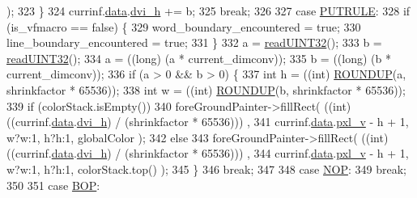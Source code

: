 \begin{DoxyCode}
{       );
323           \}
324           currinf.\hyperlink{structdrawinf_af73f66288002f0a25c7843a534bf1340}{data}.\hyperlink{structframedata_a530699c241126f99b81cee11c2c1c4e4}{dvi\_h} += b;
325           \textcolor{keywordflow}{break};
326 
327         \textcolor{keywordflow}{case} \hyperlink{dvi_8h_a88170eaff2ef781cd64fadda8b19ee87}{PUTRULE}:
328           \textcolor{keywordflow}{if} (is\_vfmacro == \textcolor{keyword}{false}) \{
329             word\_boundary\_encountered = \textcolor{keyword}{true};
330             line\_boundary\_encountered = \textcolor{keyword}{true};
331           \}
332           a = \hyperlink{classbigEndianByteReader_a39c3b90a7617e40cef20796fbc680df8}{readUINT32}();
333           b = \hyperlink{classbigEndianByteReader_a39c3b90a7617e40cef20796fbc680df8}{readUINT32}();
334           a = ((long) (a *  current\_dimconv));
335           b = ((long) (b *  current\_dimconv));
336           \textcolor{keywordflow}{if} (a > 0 && b > 0) \{
337             \textcolor{keywordtype}{int} h = ((int) \hyperlink{xdvi_8h_a20c604ddc8550203707ee1ef509ba365}{ROUNDUP}(a, shrinkfactor * 65536));
338             \textcolor{keywordtype}{int} w = ((int) \hyperlink{xdvi_8h_a20c604ddc8550203707ee1ef509ba365}{ROUNDUP}(b, shrinkfactor * 65536));
339             \textcolor{keywordflow}{if} (colorStack.isEmpty())
340               foreGroundPainter->fillRect( ((\textcolor{keywordtype}{int}) ((currinf.\hyperlink{structdrawinf_af73f66288002f0a25c7843a534bf1340}{data}.\hyperlink{structframedata_a530699c241126f99b81cee11c2c1c4e4}{dvi\_h}) / (shrinkfactor * 65536)))
      ,
341                                          currinf.\hyperlink{structdrawinf_af73f66288002f0a25c7843a534bf1340}{data}.\hyperlink{structframedata_a0e7316fa88b0240baa7ce526650131a9}{pxl\_v} - h + 1, w?w:1, h?h:1, globalColor );
342             \textcolor{keywordflow}{else}
343               foreGroundPainter->fillRect( ((\textcolor{keywordtype}{int}) ((currinf.\hyperlink{structdrawinf_af73f66288002f0a25c7843a534bf1340}{data}.\hyperlink{structframedata_a530699c241126f99b81cee11c2c1c4e4}{dvi\_h}) / (shrinkfactor * 65536)))
      ,
344                                         currinf.\hyperlink{structdrawinf_af73f66288002f0a25c7843a534bf1340}{data}.\hyperlink{structframedata_a0e7316fa88b0240baa7ce526650131a9}{pxl\_v} - h + 1, w?w:1, h?h:1, colorStack.top()
       );
345           \}
346           \textcolor{keywordflow}{break};
347 
348         \textcolor{keywordflow}{case} \hyperlink{dvi_8h_a700f88377bf36711b711f69b06c52f5d}{NOP}:
349           \textcolor{keywordflow}{break};
350 
351         \textcolor{keywordflow}{case} \hyperlink{dvi_8h_a857adfef718262ca4a28b3648c56de5c}{BOP}:
}
\end{DoxyCode}
